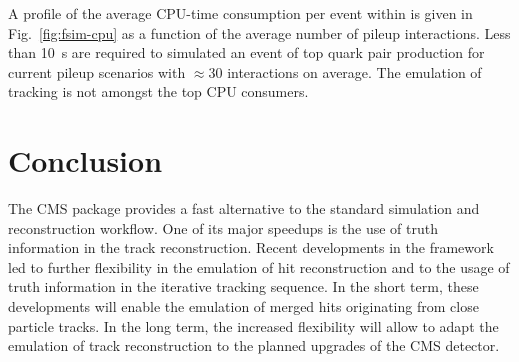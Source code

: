 A profile of the average CPU-time consumption per event within \FSIM is given in Fig.~\ref{fig:fsim-cpu} as a function of the average number of pileup interactions. Less than 10~s are required to simulated an event of top quark pair production for current pileup scenarios with $\approx30$ interactions on average. The emulation of tracking is not amongst the top CPU consumers.



\section{Conclusion}
\label{sec:fsim-conclusion}

The CMS \FSIM package provides a fast alternative to the standard simulation and reconstruction workflow. One of its major speedups is the use of truth information in the track reconstruction. Recent developments in the framework led to further flexibility in the emulation of hit reconstruction and to the usage of truth information in the iterative tracking sequence. In the short term, these developments will enable the emulation of merged hits originating from close particle tracks. In the long term, the increased flexibility will allow to adapt the emulation of track reconstruction to the planned upgrades of the CMS detector.




